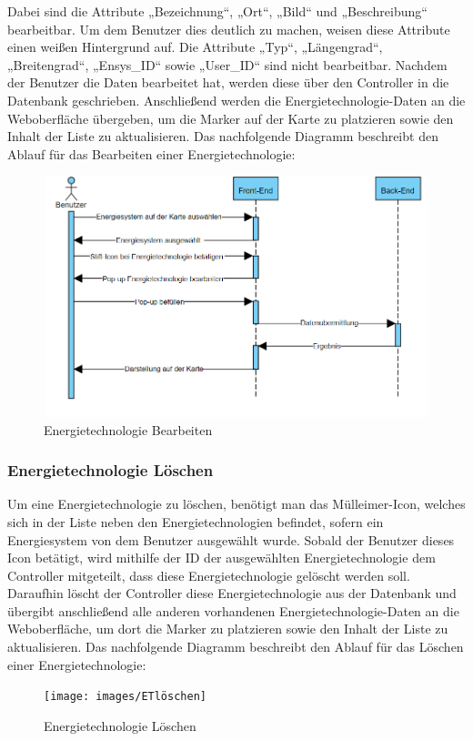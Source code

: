 Dabei sind die Attribute „Bezeichnung“, „Ort“, „Bild“ und „Beschreibung“ bearbeitbar. Um dem Benutzer dies deutlich zu machen, weisen diese Attribute einen weißen Hintergrund auf. 
Die Attribute „Typ“, „Längengrad“, „Breitengrad“, „Ensys\_ID“ sowie „User\_ID“ sind nicht bearbeitbar.
Nachdem der Benutzer die Daten bearbeitet hat, werden diese über den Controller in die Datenbank geschrieben. Anschließend werden die Energietechnologie-Daten an die Weboberfläche übergeben, um die Marker auf der Karte zu platzieren sowie den Inhalt der Liste zu aktualisieren. 
\newpage
Das nachfolgende Diagramm beschreibt den Ablauf für das Bearbeiten einer Energietechnologie:
\newline
\begin{figure}[h]
	\centering
	\includegraphics[height=7cm,width=14cm]{images/ETbearbeiten}
	\caption{Energietechnologie Bearbeiten}
	\label{fig:CSS_System}
\end{figure}

\newpage
\subsubsection{Energietechnologie Löschen}
Um eine Energietechnologie zu löschen, benötigt man das Mülleimer-Icon, welches sich in der Liste neben den Energietechnologien befindet, sofern ein Energiesystem von dem Benutzer ausgewählt wurde.
Sobald der Benutzer dieses Icon betätigt, wird mithilfe der ID der ausgewählten Energietechnologie dem Controller mitgeteilt, dass diese Energietechnologie gelöscht werden soll. Daraufhin löscht der Controller diese Energietechnologie aus der Datenbank und übergibt anschließend alle anderen vorhandenen Energietechnologie-Daten an die Weboberfläche, um dort die Marker zu platzieren sowie den Inhalt der Liste zu aktualisieren. Das nachfolgende Diagramm beschreibt den Ablauf für das Löschen einer Energietechnologie:
\begin{figure}[h]
	\centering
	\texttt{[image: images/ETlöschen]}
	\caption{Energietechnologie Löschen}
	\label{fig:CSS_System}
\end{figure}


